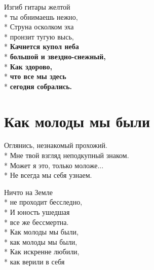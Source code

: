 \medskip

\begin{minipage}{\linewidth}
Изгиб гитары желтой\\*
ты обнимаешь нежно,\\*
Струна осколком эха\\*
пронзит тугую высь,\\*
\textbf{Качнется купол неба}\\*
\textbf{большой и звездно-снежный,}\\*
\textbf{Как здорово,}\\*
\textbf{что все мы здесь}\\*
\textbf{сегодня собрались.}\\
\end{minipage}

\vspace{\fill}\newpage

\section{Как молоды мы были}
\label{song:Как_молоды_мы_были}

\medskip

\begin{minipage}{\linewidth}
Оглянись, незнакомый прохожий.\\*
Мне твой взгляд неподкупный знаком.\\*
Может я это, только моложе...\\*
Не всегда мы себя узнаем.\\
\end{minipage}\par\medskip\nobreak

\medskip

\begin{minipage}{\linewidth}
\hspace*{1.5em}Ничто на Земле\\*
\hspace*{1.5em}не проходит бесследно,\\*
\hspace*{1.5em}И юность ушедшая\\*
\hspace*{1.5em}все же бессмертна.\\*
\hspace*{1.5em}Как молоды мы были,\\*
\hspace*{1.5em}как молоды мы были,\\*
\hspace*{1.5em}Как искренне любили,\\*
\hspace*{1.5em}как верили в себя\\
\end{minipage}\par\medskip\nobreak

